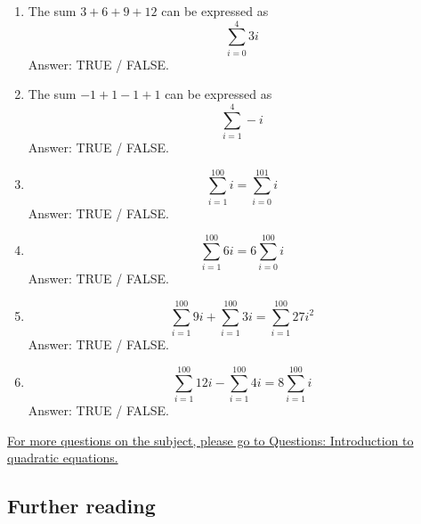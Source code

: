 \documentclass[
  12pt,
  a4paper, oneside]{starmastarticle}
\begin{document}
\begin{enumerate}
\def\labelenumi{(\alph{enumi})}
\item
  The sum \(3 + 6 + 9 + 12\) can be expressed as \[\sum_{i = 0}^{4} 3i\]
  Answer: TRUE / FALSE.
\item
  The sum \(-1 + 1 - 1 + 1\) can be expressed as \[\sum_{i = 1}^{4} -i\]
  Answer: TRUE / FALSE.
\item
  \[\sum_{i = 1}^{100} i = \sum_{i = 0}^{101} i\] Answer: TRUE / FALSE.
\item
  \[\sum_{i = 1}^{100} 6i = 6 \sum_{i = 0}^{100} i\] Answer: TRUE /
  FALSE.
\item
  \[\sum_{i = 1}^{100} 9i + \sum_{i = 1}^{100} 3i = \sum_{i = 1}^{100} 27i^2\]
  Answer: TRUE / FALSE.
\item
  \[\sum_{i = 1}^{100} 12i - \sum_{i = 1}^{100} 4i = 8 \sum_{i = 1}^{100} i\]
  Answer: TRUE / FALSE.
\end{enumerate}

\href{qs-introtoquadratics.qmd}{For more questions on the subject,
please go to Questions: Introduction to quadratic equations.}

\hypertarget{further-reading}{%
\subsection{Further reading}\label{further-reading}}
\end{document}
